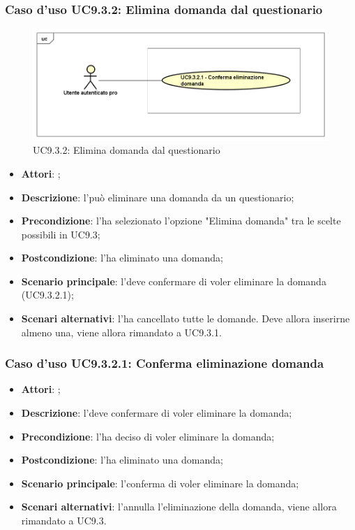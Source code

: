 		 \subsubsection{Caso d'uso UC9.3.2: Elimina domanda dal questionario}
		 \label{UC9.3.2}
		 \begin{figure}[h]
		 	\centering
		 	\includegraphics[scale=0.5,keepaspectratio]{UML/UC9_3_2.png}
		 	\caption{UC9.3.2: Elimina domanda dal questionario}
		 \end{figure}
		 \FloatBarrier
		 \begin{itemize}
		 	\item \textbf{Attori}: \uaupro;
		 	\item \textbf{Descrizione}: l'\uaupro può eliminare una domanda da un questionario;
		 	\item \textbf{Precondizione}: l'\uaupro ha selezionato l'opzione "Elimina domanda" tra le scelte possibili in UC9.3;
		 	\item \textbf{Postcondizione}: l'\uaupro ha eliminato una domanda;
		 	\item \textbf{Scenario principale}: l'\uaupro deve confermare di voler eliminare la domanda (UC9.3.2.1); 
		 	\item \textbf{Scenari alternativi}: l'\uaupro ha cancellato tutte le domande. Deve allora inserirne almeno una, viene allora rimandato a UC9.3.1.
		 \end{itemize}
		 
		 \subsubsection{Caso d'uso UC9.3.2.1: Conferma eliminazione domanda}
		 \label{UC9.3.2.1}
		 \begin{itemize}
		 	\item \textbf{Attori}: \uaupro;
		 	\item \textbf{Descrizione}: l'\uaupro deve confermare di voler eliminare la domanda;
		 	\item \textbf{Precondizione}: l'\uaupro ha deciso di voler eliminare la domanda;
		 	\item \textbf{Postcondizione}: l'\uaupro ha eliminato una domanda;
		 	\item \textbf{Scenario principale}: l'\uaupro conferma di voler eliminare la domanda;
		 	\item \textbf{Scenari alternativi}: l'\uaupro annulla l'eliminazione della domanda, viene allora rimandato a UC9.3.
		 \end{itemize}
		 
